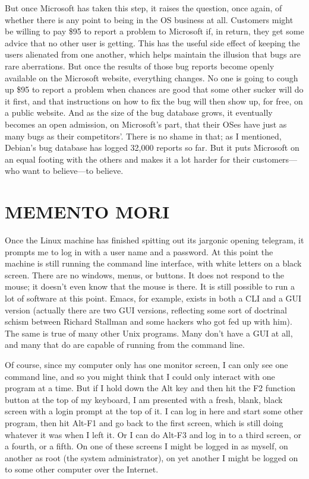 \documentclass[
  fontsize=11pt,
  paper=landscape,
  twocolumn=true,
  pagesize=pdftex,
  headings=small,
  DIV=15,
  ]{scrartcl}
\begin{document}
But once Microsoft has taken this step, it raises the question, once
again, of whether there is any point to being in the OS business at all.
Customers might be willing to pay \$95 to report a problem to Microsoft
if, in return, they get some advice that no other user is getting. This
has the useful side effect of keeping the users alienated from one
another, which helps maintain the illusion that bugs are rare
aberrations. But once the results of those bug reports become openly
available on the Microsoft website, everything changes. No one is going
to cough up \$95 to report a problem when chances are good that some
other sucker will do it first, and that instructions on how to fix the
bug will then show up, for free, on a public website. And as the size of
the bug database grows, it eventually becomes an open admission, on
Microsoft's part, that their OSes have just as many bugs as their
competitors'. There is no shame in that; as I mentioned, Debian's bug
database has logged 32,000 reports so far. But it puts Microsoft on an
equal footing with the others and makes it a lot harder for their
customers---who want to believe---to believe.

\section{MEMENTO MORI}

Once the Linux machine has finished spitting out its jargonic opening
telegram, it prompts me to log in with a user name and a password. At
this point the machine is still running the command line interface, with
white letters on a black screen. There are no windows, menus, or
buttons. It does not respond to the mouse; it doesn't even know that the
mouse is there. It is still possible to run a lot of software at this
point. Emacs, for example, exists in both a CLI and a GUI version
(actually there are two GUI versions, reflecting some sort of doctrinal
schism between Richard Stallman and some hackers who got fed up with
him). The same is true of many other Unix programs. Many don't have a
GUI at all, and many that do are capable of running from the command
line.

Of course, since my computer only has one monitor screen, I can only see
one command line, and so you might think that I could only interact with
one program at a time. But if I hold down the Alt key and then hit the
F2 function button at the top of my keyboard, I am presented with a
fresh, blank, black screen with a login prompt at the top of it. I can
log in here and start some other program, then hit Alt-F1 and go back to
the first screen, which is still doing whatever it was when I left it.
Or I can do Alt-F3 and log in to a third screen, or a fourth, or a
fifth. On one of these screens I might be logged in as myself, on
another as root (the system administrator), on yet another I might be
logged on to some other computer over the Internet.
\end{document}
